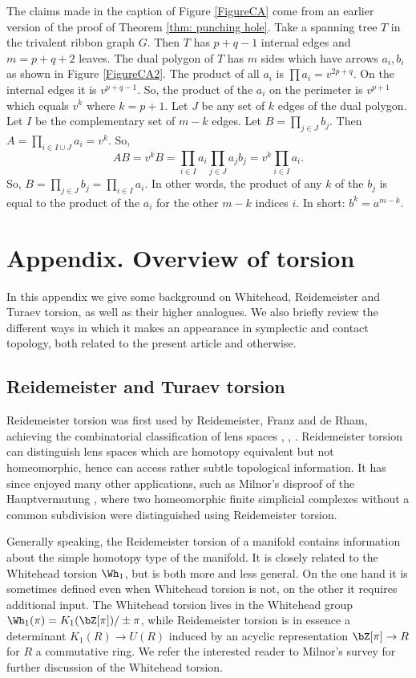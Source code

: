 \begin{remark}\label{proof of JKS}
The claims made in the caption of Figure \ref{FigureCA} come from an earlier version of the proof of Theorem \ref{thm: punching hole}. Take a spanning tree $T$ in the trivalent ribbon graph $G$. Then $T$ has $p+q-1$ internal edges and $m=p+q+2$ leaves. The dual polygon of $T$ has $m$ sides which have arrows $a_i,b_i$ as shown in Figure \ref{FigureCA2}. The product of all $a_i$ is $\prod a_i=v^{2p+q}$. On the internal edges it is $v^{p+q-1}$. So, the product of the $a_i$ on the perimeter is $v^{p+1}$ which equals $v^k$ where $k=p+1$. Let $J$ be any set of $k$ edges of the dual polygon. Let $I$ be the complementary set of $m-k$ edges. Let $B=\prod_{j\in J} b_j$. Then $A=\prod_{i\in I\cup J}a_i=v^k$. So,
\[
AB=v^kB=\prod_{i\in I} a_i\prod_{j\in J} a_jb_j=v^{k}\prod_{i\in I}a_i.
\]
So, $B=\prod_{j\in J} b_j=\prod_{i\in I}a_i$. In other words, the product of any $k$ of the $b_j$ is equal to the product of the $a_i$ for the other $m-k$ indices $i$. In short: $b^k=a^{m-k}$.
\end{remark}

\appendix
\section*{Appendix. Overview of torsion}\label{ap:torsion}
In this appendix we give some background on Whitehead, Reidemeister and Turaev torsion, as well as their higher analogues. We also briefly review the different ways in which it makes an appearance in symplectic and contact topology, both related to the present article and otherwise.

\subsection{Reidemeister and Turaev torsion}

Reidemeister torsion was first used by Reidemeister, Franz and de Rham, achieving the combinatorial classification of lens spaces \cite{R35}, \cite{F35}, \cite{dR39}. Reidemeister torsion can distinguish lens spaces which are homotopy equivalent but not homeomorphic, hence can access rather subtle topological information. It has since enjoyed many other applications, such as Milnor's disproof of the Hauptvermutung \cite{M61}, where two homeomorphic finite simplicial complexes without a common subdivision were distinguished using Reidemeister torsion.

Generally speaking, the Reidemeister torsion of a manifold contains information about the simple homotopy type of the manifold. It is closely related to the Whitehead torsion $\Wh_1$, but is both more and less general. On the one hand it is sometimes defined even when Whitehead torsion is not, on the other it requires additional input. The Whitehead torsion lives in the Whitehead group $\Wh_1(\pi)=K_1(\bZ[\pi])/\pm \pi$, while Reidemeister torsion is in essence a determinant $K_1(R) \to U(R)$ induced by an acyclic representation $\bZ[\pi] \to R$ for $R$ a commutative ring. We refer the interested reader to Milnor's survey \cite{M66} for further discussion of the Whitehead torsion.

